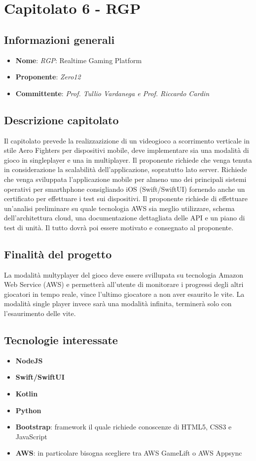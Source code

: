 \section{Capitolato 6 - RGP}
\subsection{Informazioni generali}
\begin{itemize}
    \item \textbf{Nome}: \emph{RGP}: Realtime Gaming Platform
    \item \textbf{Proponente}: \emph{Zero12}
    \item \textbf{Committente}: \emph{Prof. Tullio Vardanega e Prof. Riccardo Cardin}
\end{itemize}
\subsection{Descrizione capitolato}
Il capitolato prevede la realizzazizione di un videogioco a scorrimento verticale in stile Aero Fighters per dispositivi mobile, deve implementare sia una modalità di gioco in singleplayer e una in multiplayer.
Il proponente richiede che venga tenuta in considerazione la scalabilità dell'applicazione, sopratutto lato server.
Richiede che venga sviluppata l'applicazione mobile per almeno uno dei principali sistemi operativi per smarthphone consigliando iOS (Swift/SwiftUI) fornendo anche un certificato per effettuare i test sui dispositivi.
Il proponente richiede di effettuare un'analisi preliminare su quale tecnologia AWS sia meglio utilizzare, schema dell'architettura cloud, una documentazione dettagliata delle API e un piano di test di unità. Il tutto dovrà poi essere motivato e consegnato al proponente.
\subsection{Finalità del progetto}
La modalità multyplayer del gioco deve essere svillupata su tecnologia Amazon Web Service (AWS) e permetterà all'utente di monitorare i progressi degli altri giocatori in tempo reale, vince l'ultimo giocatore a non aver esaurito le vite. 
La modalità single player invece sarà una modalità infinita, terminerà solo con l'esaurimento delle vite.
\subsection{Tecnologie interessate}
\begin{itemize}
    \item \textbf{NodeJS}
	\item \textbf{Swift/SwiftUI}
	\item \textbf{Kotlin}
	\item \textbf{Python}
	\item \textbf{Bootstrap}: framework il quale richiede conoscenze di HTML5, CSS3 e JavaScript
	\item \textbf{AWS}: in particolare bisogna scegliere tra AWS GameLift o AWS Appsync
\end{itemize}
